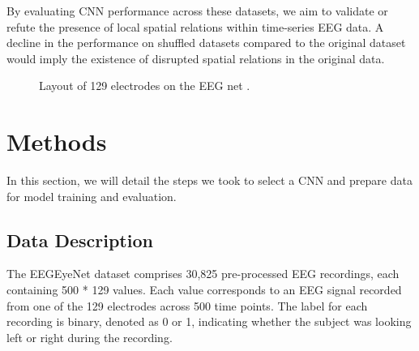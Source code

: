\documentclass[11pt]{article}
\begin{document}
By evaluating CNN performance across these datasets, we aim to validate or refute the presence of local spatial relations within time-series EEG data. A decline in the performance on shuffled datasets compared to the original dataset would imply the existence of disrupted spatial relations in the original data.

\begin{figure}[H]
\begin{center}
\end{center}
\caption{Layout of 129 electrodes on the EEG net \parencite{electrode}.}
\label{eeg_net}
\end{figure}

\section{Methods}






In this section, we will detail the steps we took to select a CNN and prepare data for model training and evaluation.

\subsection{Data Description}

The EEGEyeNet dataset comprises 30,825 pre-processed EEG recordings, each containing 500 * 129 values. Each value corresponds to an EEG signal recorded from one of the 129 electrodes across 500 time points. The label for each recording is binary, denoted as 0 or 1, indicating whether the subject was looking left or right during the recording.
\end{document}
